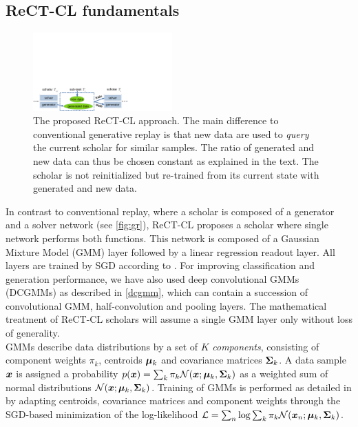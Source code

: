 \documentclass{article} %
\begin{document}
\subsection{ReCT-CL fundamentals}\label{sec:gmm}
%
\begin{figure}[b]
    \centering
    \includegraphics*[height=3cm,page=2,viewport=0in 0in 6in 2in]{figs.pdf}
    \caption{The proposed ReCT-CL approach. The main difference to conventional generative replay is that new data are used to \textit{query} the current scholar for similar samples. The ratio of generated and new data can thus be chosen constant as explained in the text. The scholar is not reinitialized but re-trained from its current state with generated and new data.}
    \label{fig:var}
\end{figure}
%
In contrast to conventional replay, where a scholar is composed of a generator and a solver network (see \cref{fig:gr}), ReCT-CL proposes a scholar where single network performs both functions. This network is composed of a Gaussian Mixture Model (GMM) layer followed by a linear regression readout layer. All layers are trained by SGD according to \cite{sgdgmm}. For improving classification and generation performance, we have also used deep convolutional GMMs (DCGMMs) as described in \cref{dcgmm}, which can contain a succession of convolutional GMM, half-convolution and pooling layers. The mathematical treatment of ReCT-CL scholars will assume a single GMM layer only without loss of generality. 
\\
GMMs describe data distributions by a set of $K$ \textit{components}, consisting of component weights $\pi_k$, centroids ${\bm{\mu}}_k$ and covariance matrices ${\bm{\Sigma}}_k$. A data sample ${\bm{x}}$ is assigned a probability $p({\bm{x}}) = \sum_k \pi_k \mathcal N({\bm{x}} ; {\bm{\mu}}_k, {\bm{\Sigma}}_k)$ as a weighted sum of normal distributions $\mathcal N({\bm{x}}; {\bm{\mu}}_k, {\bm{\Sigma}}_k)$. Training of GMMs is performed as detailed in \cite{sgdgmm} by adapting centroids, covariance matrices and component weights through the SGD-based minimization of the log-likelihood $\mathcal L=\sum_n \log \sum_k \pi_k \mathcal N({\bm{x}}_n; {\bm{\mu}}_k,{\bm{\Sigma}}_k)$.
\\
\end{document}
